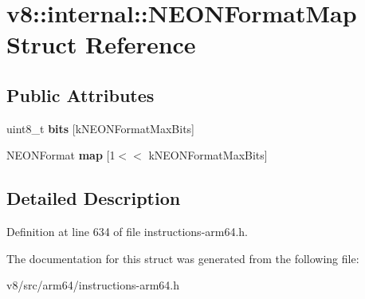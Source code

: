 \hypertarget{structv8_1_1internal_1_1NEONFormatMap}{}\section{v8\+:\+:internal\+:\+:N\+E\+O\+N\+Format\+Map Struct Reference}
\label{structv8_1_1internal_1_1NEONFormatMap}
\subsection*{Public Attributes}
\begin{DoxyCompactItemize}
\item 
\mbox{\label{structv8_1_1internal_1_1NEONFormatMap_a54d297735d4d9d59607b52f167fcbb20}} 
uint8\+\_\+t {\bfseries bits} \mbox{[}k\+N\+E\+O\+N\+Format\+Max\+Bits\mbox{]}
\item 
\mbox{\label{structv8_1_1internal_1_1NEONFormatMap_a28da05fda9616c625e400d621250a42e}} 
N\+E\+O\+N\+Format {\bfseries map} \mbox{[}1$<$$<$ k\+N\+E\+O\+N\+Format\+Max\+Bits\mbox{]}
\end{DoxyCompactItemize}


\subsection{Detailed Description}


Definition at line 634 of file instructions-\/arm64.\+h.



The documentation for this struct was generated from the following file\+:\begin{DoxyCompactItemize}
\item 
v8/src/arm64/instructions-\/arm64.\+h\end{DoxyCompactItemize}
